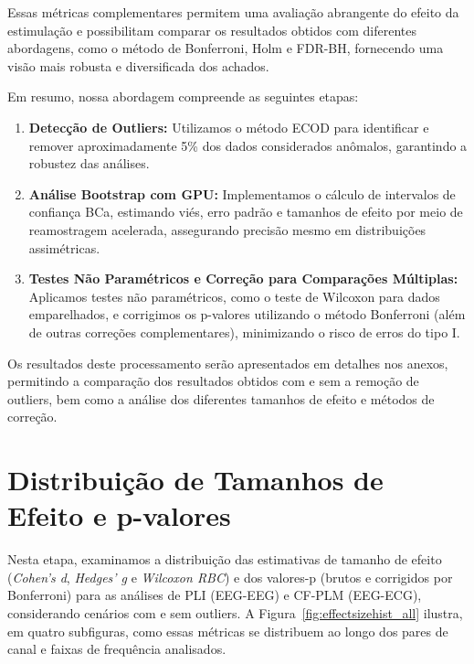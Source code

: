 Essas métricas complementares permitem uma avaliação abrangente do efeito da estimulação e possibilitam comparar os resultados obtidos com diferentes abordagens, como o método de Bonferroni, Holm e FDR-BH, fornecendo uma visão mais robusta e diversificada dos achados.

Em resumo, nossa abordagem compreende as seguintes etapas:
\begin{enumerate}
    \item \textbf{Detecção de Outliers:} Utilizamos o método ECOD para identificar e remover aproximadamente 5\% dos dados considerados anômalos, garantindo a robustez das análises.
    \item \textbf{Análise Bootstrap com GPU:} Implementamos o cálculo de intervalos de confiança BCa, estimando viés, erro padrão e tamanhos de efeito por meio de reamostragem acelerada, assegurando precisão mesmo em distribuições assimétricas.
    \item \textbf{Testes Não Paramétricos e Correção para Comparações Múltiplas:} Aplicamos testes não paramétricos, como o teste de Wilcoxon para dados emparelhados, e corrigimos os p-valores utilizando o método Bonferroni (além de outras correções complementares), minimizando o risco de erros do tipo I.
\end{enumerate}

Os resultados deste processamento serão apresentados em detalhes nos anexos, permitindo a comparação dos resultados obtidos com e sem a remoção de outliers, bem como a análise dos diferentes tamanhos de efeito e métodos de correção.

\section{Distribuição de Tamanhos de Efeito e p-valores}
\label{sec:effect_size_distribution}

Nesta etapa, examinamos a distribuição das estimativas de tamanho de efeito (\emph{Cohen's d}, \emph{Hedges' g} e \emph{Wilcoxon RBC}) e dos valores-p (brutos e corrigidos por Bonferroni) para as análises de PLI (EEG-EEG) e CF-PLM (EEG-ECG), considerando cenários com e sem outliers. A Figura~\ref{fig:effectsizehist_all} ilustra, em quatro subfiguras, como essas métricas se distribuem ao longo dos pares de canal e faixas de frequência analisados.

